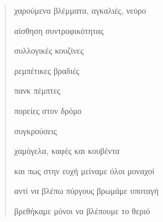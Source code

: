 \documentclass[12pt]{article}
\begin{document}
\begin{verse}
  χαρούμενα βλέμματα, αγκαλιές, νεύρο

  αίσθηση συντροφικότητας

  συλλογικές κουζίνες

  ρεμπέτικες βραδιές

  πανκ πέμπτες

  πορείες στον δρόμο

  συγκρούσεις

  χαμόγελα, καφές και κουβέντα

  και πως στην ευχή μείναμε όλοι μοναχοί

  αντί να βλέπω πύργους βρωμάμε υποταγή


  βρεθήκαμε μόνοι να βλέπουμε το θεριό


\end{verse}
\end{document}
